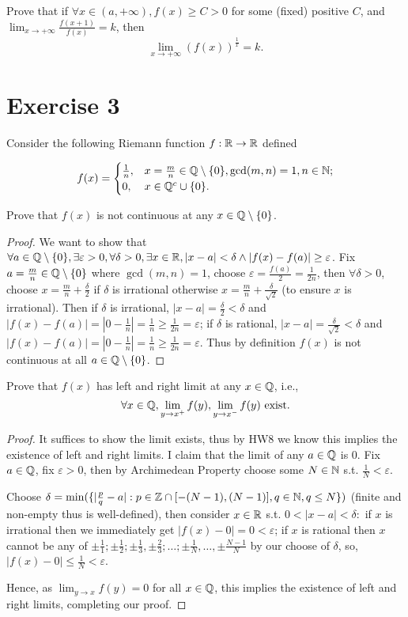 \documentclass{homework}
\newcommand{\R}{\bb{R}} %
\newcommand{\Q}{\bb{Q}} %
\newcommand{\Z}{\bb{Z}} %
\newcommand{\N}{\bb{N}} %
\newcommand{\ra}{\rightarrow}
\newcommand{\?}{\stackrel{?}{=}}
\newcommand{\ep}{\varepsilon}
\theoremstyle{definition}
\begin{document}
\question[2] Prove that if $\forall x\in (a,+\infty), f(x)\geq C > 0$ for some (fixed) positive $C$, and $\displaystyle\lim_{x\ra+\infty}\frac{f(x+1)}{f(x)}=k$, then \[\lim_{x\ra+\infty}(f(x))^{\frac1x}=k.\]


\newpage
\section*{Exercise 3}

Consider the following Riemann function $f:\R\to\R$ defined

\[f(x)=\begin{cases}
    \frac1n, &x=\frac{m}n\in\Q\setminus\{0\}, \gcd(m,n)=1, n\in\N; \\ 0,& x\in\Q^c\cup\{0\}.
\end{cases}\]

\question[1] Prove that $f(x)$ is not continuous at any $x\in\Q\setminus\{0\}$.

\begin{proof}
    We want to show that $\forall a\in\Q\setminus\{0\},\exists\ep>0,\forall\delta>0,\exists x\in\R, |x-a|<\delta\land|f(x)-f(a)|\geq\ep$. Fix $a=\frac{m}{n}\in\Q\setminus\{0\}$ where $\gcd(m,n)=1$, choose $\ep=\frac{f(a)}{2}=\frac1{2n}$, then $\forall\delta>0$, choose $x=\frac{m}{n}+\frac{\delta}{2}$ if $\delta$ is irrational otherwise $x=\frac{m}{n}+\frac{\delta}{\sqrt2}$ (to ensure $x$ is irrational). Then if $\delta$ is irrational, $|x-a|=\frac{\delta}{2}<\delta$ and $|f(x)-f(a)|=|0-\frac1n|=\frac1n\geq\frac1{2n}=\ep$; if $\delta$ is rational, $|x-a|=\frac{\delta}{\sqrt2}<\delta$ and $|f(x)-f(a)|=|0-\frac1n|=\frac1n\geq\frac1{2n}=\ep$. Thus by definition $f(x)$ is not continuous at all $a\in\Q\setminus\{0\}$.
\end{proof}

\question[2] Prove that $f(x)$ has left and right limit at any $x\in\Q$, i.e., \[\forall x\in\Q, \displaystyle\lim_{y\ra x^+}f(y), \lim_{y\ra x^-}f(y)\text{ exist.}\]

\begin{proof}
    It suffices to show the limit exists, thus by HW8 we know this implies the existence of left and right limits. I claim that the limit of any $a\in\Q$ is $0$. Fix $a\in\Q$, fix $\ep>0$, then by Archimedean Property choose some $N\in\N$ s.t. $\frac1N<\ep$. 

    Choose $\delta=\min(\{|\frac{p}{q}-a|:p\in\Z\cap[-(N-1), (N-1)], q\in\N, q\leq N\})$ (finite and non-empty thus is well-defined), then consider $x\in\R$ s.t. $0<|x-a|<\delta:$ if $x$ is irrational then we immediately get $|f(x)-0|=0<\ep$; if $x$ is rational then $x$ cannot be any of $\pm\frac11; \pm\frac12; \pm\frac13, \pm\frac23; \ldots; \pm\frac1N, \ldots, \pm\frac{N-1}{N}$ by our choose of $\delta$, so, $|f(x)-0|\leq\frac1{N}<\ep$.

    Hence, as $\displaystyle\lim_{y\ra x}f(y)=0$ for all $x\in\Q$, this implies the existence of left and right limits, completing our proof.

\end{proof}
\end{document}
